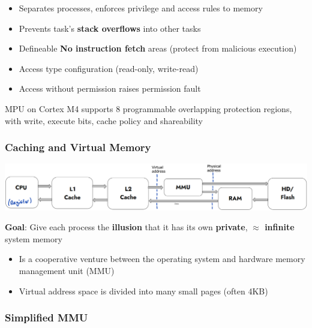 \documentclass[
  10pt,
  a4paper,
]{article}
\providecommand{\tightlist}{%
  \setlength{\itemsep}{0pt}\setlength{\parskip}{0pt}}\usepackage{longtable,booktabs,array}
\begin{document}
\begin{multicols*}{2}
{\small

\begin{itemize}
\tightlist
\item
  Separates processes, enforces privilege and access rules to memory
\item
  Prevents task's \textbf{stack overflows} into other tasks
\item
  Defineable \textbf{No instruction fetch} areas (protect from malicious
  execution)
\item
  Access type configuration (read-only, write-read)
\item
  Access without permission raises permission fault
\end{itemize}

}
{\footnotesize MPU on Cortex M4 supports 8 programmable overlapping protection regions, with write, execute bits, cache policy and shareability}

\subsubsection{Caching and Virtual
Memory}\label{caching-and-virtual-memory}

\includegraphics{images/performance/image-19.png}

{\footnotesize \textbf{Goal}: Give each process the \textbf{illusion} that it has its own \textbf{private}, \textbf{$\approx$ infinite} system memory}

{\small

\begin{itemize}
\tightlist
\item
  Is a cooperative venture between the operating system and hardware
  memory management unit (MMU)
\item
  Virtual address space is divided into many small pages (often 4KB)
\end{itemize}

}

\subsubsection{Simplified MMU}\label{simplified-mmu}


\end{multicols*}
\end{document}
